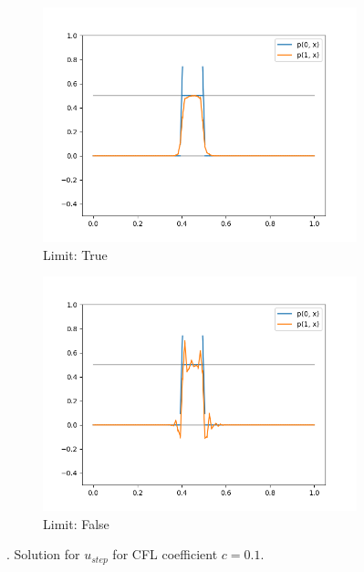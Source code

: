 \begin{figure}[h!]
	\centering
	\begin{subfigure}{.5\textwidth}
		\centering
		\includegraphics[width=\linewidth]{../figs/sols/adv1d-sol-o2h100-limit}
		\caption{Limit: True}
	\end{subfigure}%
	\begin{subfigure}{.5\textwidth}
		\centering
		\includegraphics[width=\linewidth]{../figs/sols/adv1d-sol-o2h100-nolimit}
		\caption{Limit: False}
	\end{subfigure}
	\caption{. Solution for $u_{step}$ for CFL coefficient $c=0.1$.}
	\label{fig:sol_adv1D}
\end{figure}

